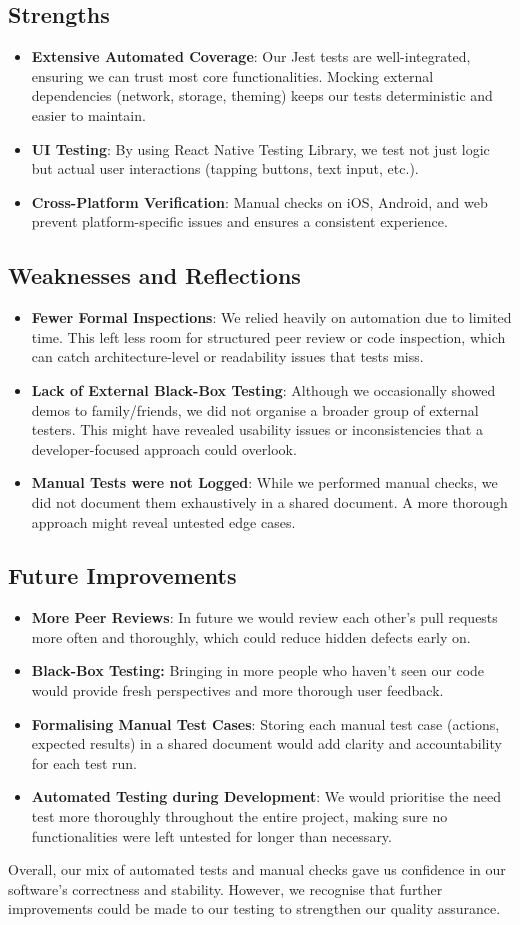 \subsection{Strengths} \begin{itemize} \item \textbf{Extensive Automated Coverage}: Our Jest tests are well-integrated, ensuring we can trust most core functionalities. Mocking external dependencies (network, storage, theming) keeps our tests deterministic and easier to maintain. \item \textbf{UI Testing}: By using React Native Testing Library, we test not just logic but actual user interactions (tapping buttons, text input, etc.). \item \textbf{Cross-Platform Verification}: Manual checks on iOS, Android, and web prevent platform-specific issues and ensures a consistent experience. \end{itemize}

\subsection{Weaknesses and Reflections} \begin{itemize} \item \textbf{Fewer Formal Inspections}: We relied heavily on automation due to limited time. This left less room for structured peer review or code inspection, which can catch architecture-level or readability issues that tests miss. \item \textbf{Lack of External Black-Box Testing}: Although we occasionally showed demos to family/friends, we did not organise a broader group of external testers. This might have revealed usability issues or inconsistencies that a developer-focused approach could overlook. \item \textbf{Manual Tests were not Logged}: While we performed manual checks, we did not document them exhaustively in a shared document. A more thorough approach might reveal untested edge cases. \end{itemize}

\subsection{Future Improvements} \begin{itemize} \item \textbf{More Peer Reviews}: In future we would review each other’s pull requests more often and thoroughly, which could reduce hidden defects early on. \item \textbf{Black-Box Testing:} Bringing in more people who haven’t seen our code would provide fresh perspectives and more thorough user feedback. \item \textbf{Formalising Manual Test Cases}: Storing each manual test case (actions, expected results) in a shared document would add clarity and accountability for each test run.
\item \textbf{Automated Testing during Development}: We would prioritise the need test more thoroughly throughout the entire project, making sure no functionalities were left untested for longer than necessary.\end{itemize}

\noindent Overall, our mix of automated tests and manual checks gave us confidence in our software’s correctness and stability. However, we recognise that further improvements could be made to our testing to strengthen our quality assurance.